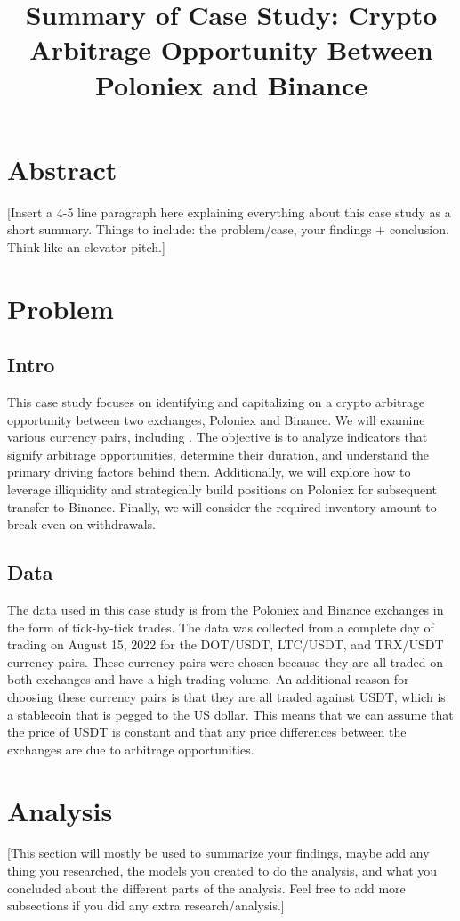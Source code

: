 \documentclass{article}
\begin{document}
\title{\textbf{Summary of Case Study: Crypto Arbitrage Opportunity Between Poloniex and Binance}}
\maketitle

\section{Abstract}
[Insert a 4-5 line paragraph here explaining everything about this case study as a short summary. Things to include: the problem/case, your findings + conclusion. Think like an elevator pitch.]

\section{Problem}
\subsection{Intro}
This case study focuses on identifying and capitalizing on a crypto arbitrage opportunity between two exchanges, Poloniex and Binance. We will examine various currency pairs, including  . The objective is to analyze indicators that signify arbitrage opportunities, determine their
duration, and understand the primary driving factors behind them. Additionally, we will explore how to
leverage illiquidity and strategically build positions on Poloniex for subsequent transfer to Binance. Finally,
we will consider the required inventory amount to break even on withdrawals.
\subsection{Data}
The data used in this case study is from the Poloniex and Binance exchanges in the form of tick-by-tick trades. The data was collected from a complete day of trading on August 15, 2022 for the DOT/USDT, LTC/USDT, and TRX/USDT currency pairs. These currency pairs were chosen because they are all traded on both exchanges and have a high trading volume. An additional reason for choosing these currency pairs is that they are all traded against USDT, which is a stablecoin that is pegged to the US dollar. This means that we can assume that the price of USDT is constant and that any price differences between the exchanges are due to arbitrage opportunities.

\section{Analysis}
[This section will mostly be used to summarize your findings, maybe add any thing you researched, the models you created to do the analysis, and what you concluded about the different parts of the analysis. Feel free to add more subsections if you did any extra research/analysis.]
\end{document}
